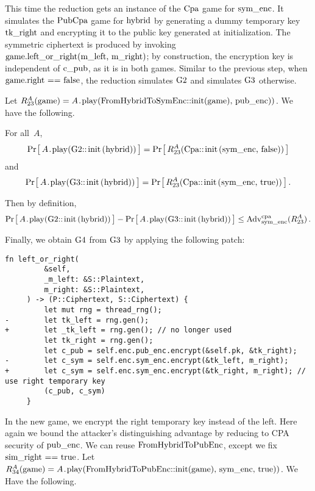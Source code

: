 %
This time the reduction gets an instance of the
\hyperref[fig/symenc/security]{$\code{Cpa}$} game for $\code{sym_enc}$. It
simulates the $\code{PubCpa}$ game for $\code{hybrid}$ by generating a dummy
temporary key $\code{tk_right}$ and encrypting it to the public key generated at
initialization. The symmetric ciphertext is produced by invoking
$\code{game.left_or_right(m_left, m_right)}$; by construction, the encryption
key is independent of $\code{c_pub}$, as it is in both games.
%
Similar to the previous step, when $\code{game.right == false}$, the reduction
simulates $\code{G2}$ and simulates $\code{G3}$ otherwise.

Let $R_{\code{23}}^A(\code{game}) =
A\code{.play(FromHybridToSymEnc::init(game), pub_enc))}$.
%
We have the following.
%

\begin{claim}[Reduction]
  For all~$A$,
  \[
    \Prob{A\code{.play(G2::init(hybrid))}} =
    \Prob{R_{\code{23}}^A(\code{Cpa::init(sym_enc, false)})}
  \]
  and
  \[
    \Prob{A\code{.play(G3::init(hybrid))}} =
    \Prob{R_{\code{23}}^A(\code{Cpa::init(sym_enc, true)})} \,.
  \]
\end{claim}
%
Then by definition,
%
\[
  \Prob{A\code{.play(G2::init(hybrid))}} -
  \Prob{A\code{.play(G3::init(hybrid))}} \leq
  \Adv{cpa}_\code{sym_enc}(R_{\code{23}}^A) \,.
\]

Finally, we obtain $\code{G4}$ from $\code{G3}$ by applying the following patch:
%
\begin{lstlisting}[style=patch]
    fn left_or_right(
         &self,
         _m_left: &S::Plaintext,
         m_right: &S::Plaintext,
     ) -> (P::Ciphertext, S::Ciphertext) {
         let mut rng = thread_rng();
-        let tk_left = rng.gen();
+        let _tk_left = rng.gen(); // no longer used
         let tk_right = rng.gen();
         let c_pub = self.enc.pub_enc.encrypt(&self.pk, &tk_right);
-        let c_sym = self.enc.sym_enc.encrypt(&tk_left, m_right);
+        let c_sym = self.enc.sym_enc.encrypt(&tk_right, m_right); // use right temporary key
         (c_pub, c_sym)
     }
\end{lstlisting}
%
In the new game, we encrypt the right temporary key instead of the left. Here
again we bound the attacker's distinguishing advantage by reducing to CPA
security of $\code{pub_enc}$.
%
We can reuse $\code{FromHybridToPubEnc}$, except we fix $\code{sim_right ==
true}$.
%
Let $R_{\code{34}}^A(\code{game}) =
A\code{.play(FromHybridToPubEnc::init(game), sym_enc, true))}$.
%
We Have the following.

